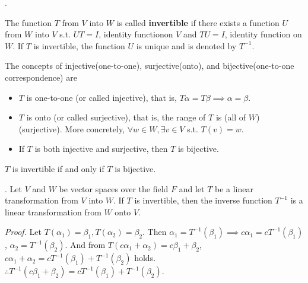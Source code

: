 \documentclass[8pt]{beamer}
\newcommand{\tb}[1]{\textbf{#1}}
\newcommand{\ti}[1]{\textit{#1}}
\begin{document}
\begin{frame}{.}

    \begin{definition}
        The function $T$ from $V$ into $W$ is called \tb{invertible} if there exists a function $U$ from $W$ into $V$ s.t. $UT = I$, identity functionon $V$ and $TU = I$, identity function on $W$. If $T$ is invertible, the function $U$ is unique and is denoted by $T^{-1}$.
    \end{definition}

    The concepts of injective(one-to-one), surjective(onto), and bijective(one-to-one correspondence) are
    \begin{itemize}
        \item $T$ is one-to-one (or called injective), that is, $T\alpha = T\beta \implies \alpha =\beta$.
        \item $T$ is onto (or called surjective), that is, the range of $T$ is (all of $W$) (surjective). More concretely, $\forall w \in W, \exists v \in V$ s.t. $T(v) = w$.
        \item If $T$ is both injective and surjective, then $T$ is bijective.
    \end{itemize}

    $T$ is invertible if and only if $T$ is bijective.

    \begin{theorem}{.}
        Let $V$ and $W$ be vector spaces over the field $F$ and let $T$ be a linear transformation from $V$ into $W$. If $T$ is invertible, then the inverse function $T^{-1}$ is a linear transformation from $W$ onto $V$.
    \end{theorem}
    \ti{Proof.} Let $T(\alpha_1) = \beta_1, T(\alpha_2) = \beta_2$. Then $\alpha_1 = T^{-1}(\beta_1) \implies c\alpha_1 = c T^{-1}(\beta_1)$, $\alpha_2 = T^{-1}(\beta_2)$. And from $T(c\alpha_1 + \alpha_2) = c\beta_1 + \beta_2$, $c\alpha_1 + \alpha_2 = c T^{-1}(\beta_1) + T^{-1}(\beta_2)$ holds. $\therefore T^{-1}(c\beta_1 + \beta_2) = cT^{-1}(\beta_1) + T^{-1}(\beta_2)$.

\end{frame}
\end{document}
